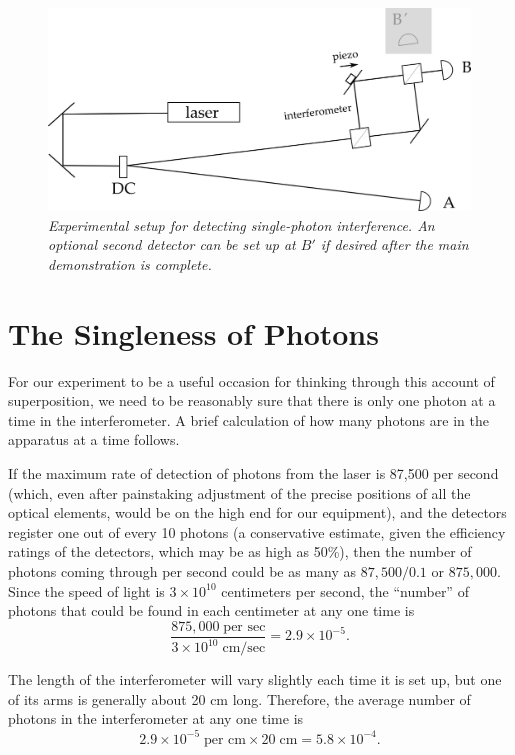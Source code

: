 \begin{figure}[h]
  \centering
    \includegraphics[width=4.40667in,height=2.11667in]{images/14_interference/interference-apparatus.png}
    \captionsetup{width=.75\textwidth}
    \caption*{\emph{Experimental setup for detecting single-photon interference. An optional second detector
    can be set up at $B'$ if desired after the main demonstration is complete.}}
\end{figure}

\section*{The Singleness of Photons}

For our experiment to be a useful occasion for thinking through this account of superposition, we need to be reasonably sure that there is only one photon at a time in the interferometer.  A brief calculation of how many photons are in the apparatus at a time follows.

If the maximum rate of detection of photons from the laser is 87,500 per second (which, even after painstaking adjustment of the precise positions of all the optical elements, would be on the high end for our equipment), and the detectors register one out of every 10 photons (a conservative estimate, given the efficiency ratings of the detectors, which may be as high as 50\%), then the number of photons coming through per second could be as many as $87,500/0.1$ or $875,000$.  Since the speed of light is $3\times 10^{10}$ centimeters per second, the ``number'' of photons that could be found in each centimeter at any one time is
\[\frac{875,000 \; \text{per sec}}{3 \times 10^{10}\; \text{cm/sec}} = 2.9 \times 10^{-5}. \]

The length of the interferometer will vary slightly each time it is set up, but one of its arms is generally about 20 cm long.  Therefore, the average number of photons in the interferometer at any one time is 
\[2.9 \times 10^{-5} \; \text{per cm} \times 20 \; \text{cm} = 5.8 \times 10^{-4}. \]

